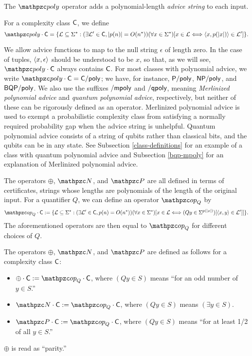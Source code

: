 The $\cpoly$ operator adds a polynomial-length \textit{advice string} to each 
input.
\begin{definition}
For a complexity class $\mathsf{C}$, we define
\[
  \cpoly\cdot\sC=\{\cL\subseteq\Sigma^*:(\exists \cL^\prime\in\sC,
  |p(n)|=\Oh(n^*))(\forall x\in\Sigma^*)[x\in\cL\Longleftrightarrow
  \inner{x,p(|x|)}\in\cL^\prime]\}.
\]
\end{definition}
We allow advice functions to map to the null string $\epsilon$ of length
zero. In the case of tuples, $\left\langle x,\epsilon\right\rangle$ should be understood to be
$x$, so that, as we will see, $\cpoly\cdot\sC$ always contains $\mathsf{C}$. For most
classes with polynomial advice, we write $\cpoly\cdot\sC=\sC/\poly$; we have, for
instance, $\mathsf{P}/\mathsf{poly}$, $\mathsf{NP}/\mathsf{poly}$, and $\mathsf{BQP}/\mathsf{poly}$. We also use the suffixes
$/\mathsf{mpoly}$ and $/\mathsf{qpoly}$, meaning \textit{Merlinized polynomial advice} 
and \textit{quantum polynomial advice}, respectively, but neither of these can be 
rigorously defined as an operator. Merlinized polynomial advice is used to exempt a
probabilistic complexity class from satisfying a normally required probability gap 
when the advice string is unhelpful. Quantum polynomial advice consists of a string
of qubits rather than classical bits, and the qubits can be in any state. See 
Subsection \ref{class-definitions} for an 
example of a class with quantum polynomial advice and Subsection \ref{bqp-mpoly} 
for an explanation of Merlinized polynomial advice.

The operators $\oplus$, $\cN$, and $\cP$ are all defined in terms of
certificates, strings whose lengths are polynomials of the length of the
original input. For a quantifier $Q$, we can define an operator $\op_Q$ by
\[
  \op_Q\cdot\sC:=\{\cL\subseteq\Sigma^*:
  (\exists\cL^\prime\in\sC, p(n)=\Oh(n^*))(\forall x\in\Sigma^*)
  [x\in\cL\Longleftrightarrow(Qy\in\Sigma^{p(|x|)})[\inner{x,y}\in\cL^\prime]]\}.
\]
The aforementioned operators are then equal to $\op_Q$ for different choices of
$Q$.
\begin{definition}
The operators $\oplus$, $\cN$, and $\cP$ are defined as follows for a
complexity class $\mathsf{C}$:
\begin{itemize}
\item $\oplus\cdot\sC:=\op_Q\cdot\sC$, where $(Qy\in S)$ means ``for an odd
  number of $y\in S$.''
\item $\cN\cdot\sC:=\op_Q\cdot\sC$, where $(Qy\in S)$ means $(\exists y\in S)$.
\item $\cP\cdot\sC:=\op_Q\cdot\sC$, where $(Qy\in S)$ means ``for at least 1/2
  of all $y\in S$.''
\end{itemize}
$\oplus$ is read as ``parity.''
\end{definition}

